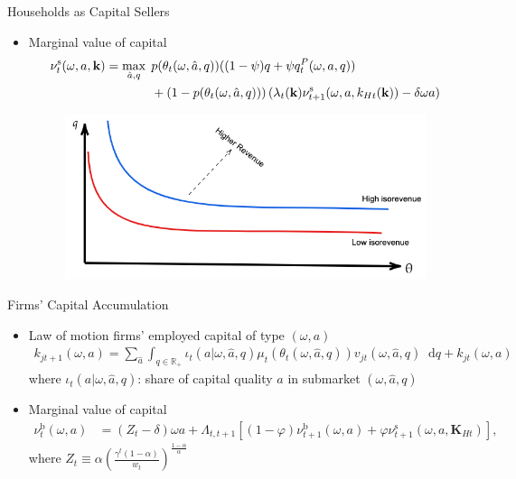 \documentclass[english,xcolor=svgnames,aspectratio=169]{beamer}
\newcommand*\diff{\mathop{}\!\mathrm{d}}
\begin{document}
\begin{frame}{Households as Capital Sellers}

\begin{itemize}

\item {\color{dblue} Marginal value of capital}
\begin{align*}
\nu^{\mathrm{s}}_{t}(\omega,a,\mathbf{k}) =\max_{ \hat a, q} \:\: & p(\theta_t(\omega,\hat a, {q}))((1-\psi)q + \psi q^{P}_{t}(\omega,a,q)) \notag\\
&+ \left(1-  p(\theta_t(\omega,\hat a,{q}))\right) (\lambda_{t}({\mathbf{k}}) \nu^{\mathrm{s}}_{t+1}(\omega,a,k_{Ht}(\mathbf{k})) - \delta \omega a)
\end{align*}

\begin{figure}
\includegraphics[scale=0.4]{figures/isorevenues_new.png}
\end{figure}
\end{itemize}

\end{frame}







\begin{frame}{Firms' Capital Accumulation}

\begin{itemize}

\item Law of motion firms' {\color{dblue}employed capital} of type $(\omega,a)$
\begin{align*}
k_{jt+1}(\omega,a) =\sum_{\hat a} \int_{q \in \mathbb{R}_{+}}\iota_{t}(a|\omega,\hat{a},q)\mu_{t}\left(\theta_{t}\left(\omega,\hat a,q\right)\right)v_{jt}(\omega,\hat a,q) \diff q+k_{jt}(\omega,a)
\end{align*}
\medskip
{\scriptsize{where $\iota_{t}(a|\omega,\hat{a},q)$: share of capital quality $a$ in submarket $(\omega,\hat{a}, q)$ }}
\bigskip
\item {\color{dblue} Marginal value of capital}
\begin{align*}
\nu^{\mathrm{b}}_{t}(\omega,a) &= (Z_t - \delta) \omega a  +  \Lambda_{t,t+1} \left[ (1-\varphi) \nu^{\mathrm{b}}_{t+1}(\omega,a) + \varphi \nu^{\mathrm{s}}_{t+1}(\omega,a,{\mathbf{K}}_{Ht}) \right],
\end{align*}
{\scriptsize{where $Z_t \equiv  \alpha \left( \frac{\gamma^t (1-\alpha)}{w_t}\right)^{\frac{1-\alpha}{\alpha}}$}}

\end{itemize}

\end{frame}
\end{document}
